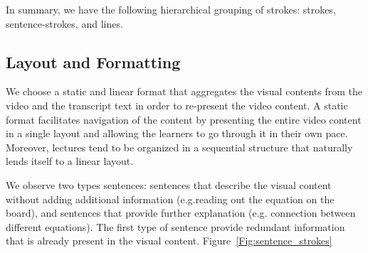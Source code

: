 In summary, we have the following hierarchical grouping of strokes: strokes, sentence-strokes, and lines.



\subsection{Layout and Formatting}
We choose a static and linear format that aggregates the visual contents from the video and the transcript text in order to re-present the video content. A static format facilitates navigation of the content by presenting the entire video content in a single layout and  allowing the learners to go through it in their own pace. Moreover, lectures tend to be organized in a sequential structure that naturally lends itself to a linear layout. 

We observe two types sentences: sentences that describe the visual content without adding additional information (e.g.reading out the equation on the board), and sentences that provide further explanation (e.g. connection between different equations). The first type of sentence provide redundant information that is already present in the visual content. Figure~\ref{Fig:sentence_strokes} 


